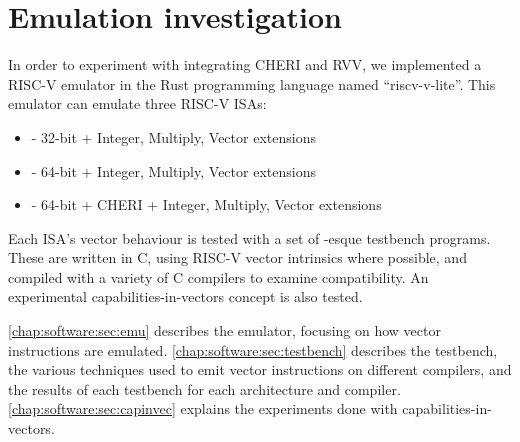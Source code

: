 \chapter{Emulation investigation}
In order to experiment with integrating CHERI and RVV, we implemented a RISC-V emulator in the Rust programming language named \enquote{riscv-v-lite}.
This emulator can emulate three RISC-V ISAs: 
\begin{itemize}
    \item {} - 32-bit + Integer, Multiply, Vector extensions
    \item {} - 64-bit + Integer, Multiply, Vector extensions
    \item {} - 64-bit + CHERI + Integer, Multiply, Vector extensions
\end{itemize}
Each ISA's vector behaviour is tested with a set of -esque testbench programs.
These are written in C, using RISC-V vector intrinsics where possible, and compiled with a variety of C compilers to examine compatibility.
An experimental capabilities-in-vectors concept is also tested.

\cref{chap:software:sec:emu} describes the emulator, focusing on how vector instructions are emulated.
\cref{chap:software:sec:testbench} describes the testbench, the various techniques used to emit vector instructions on different compilers, and the results of each testbench for each architecture and compiler.
\cref{chap:software:sec:capinvec} explains the experiments done with capabilities-in-vectors.



